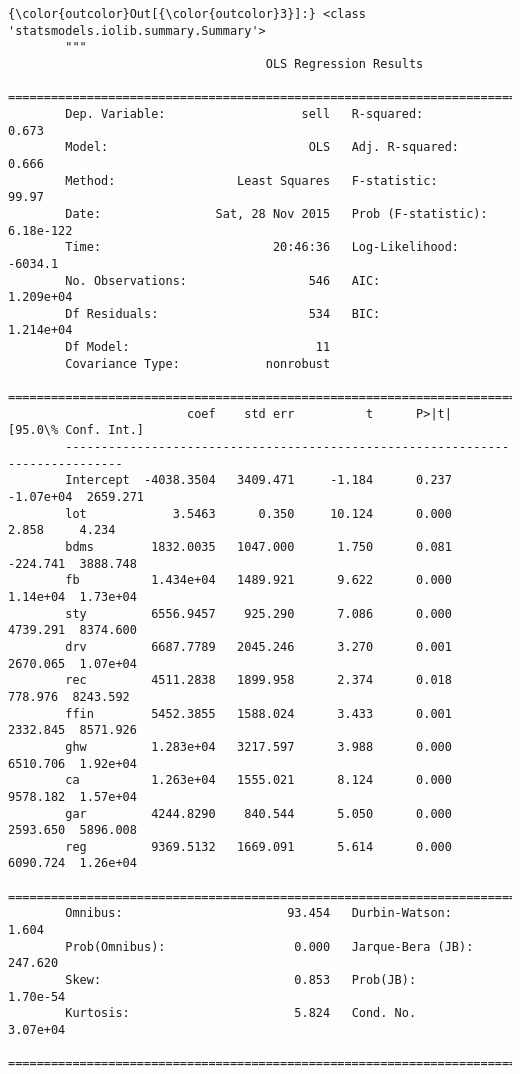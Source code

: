 \documentclass[11pt]{article}
\begin{document}
\begin{Verbatim}[commandchars=\\\{\}]
{\color{outcolor}Out[{\color{outcolor}3}]:} <class 'statsmodels.iolib.summary.Summary'>
        """
                                    OLS Regression Results                            
        ==============================================================================
        Dep. Variable:                   sell   R-squared:                       0.673
        Model:                            OLS   Adj. R-squared:                  0.666
        Method:                 Least Squares   F-statistic:                     99.97
        Date:                Sat, 28 Nov 2015   Prob (F-statistic):          6.18e-122
        Time:                        20:46:36   Log-Likelihood:                -6034.1
        No. Observations:                 546   AIC:                         1.209e+04
        Df Residuals:                     534   BIC:                         1.214e+04
        Df Model:                          11                                         
        Covariance Type:            nonrobust                                         
        ==============================================================================
                         coef    std err          t      P>|t|      [95.0\% Conf. Int.]
        ------------------------------------------------------------------------------
        Intercept  -4038.3504   3409.471     -1.184      0.237     -1.07e+04  2659.271
        lot            3.5463      0.350     10.124      0.000         2.858     4.234
        bdms        1832.0035   1047.000      1.750      0.081      -224.741  3888.748
        fb          1.434e+04   1489.921      9.622      0.000      1.14e+04  1.73e+04
        sty         6556.9457    925.290      7.086      0.000      4739.291  8374.600
        drv         6687.7789   2045.246      3.270      0.001      2670.065  1.07e+04
        rec         4511.2838   1899.958      2.374      0.018       778.976  8243.592
        ffin        5452.3855   1588.024      3.433      0.001      2332.845  8571.926
        ghw         1.283e+04   3217.597      3.988      0.000      6510.706  1.92e+04
        ca          1.263e+04   1555.021      8.124      0.000      9578.182  1.57e+04
        gar         4244.8290    840.544      5.050      0.000      2593.650  5896.008
        reg         9369.5132   1669.091      5.614      0.000      6090.724  1.26e+04
        ==============================================================================
        Omnibus:                       93.454   Durbin-Watson:                   1.604
        Prob(Omnibus):                  0.000   Jarque-Bera (JB):              247.620
        Skew:                           0.853   Prob(JB):                     1.70e-54
        Kurtosis:                       5.824   Cond. No.                     3.07e+04
        ==============================================================================
        

\end{Verbatim}
\end{document}
